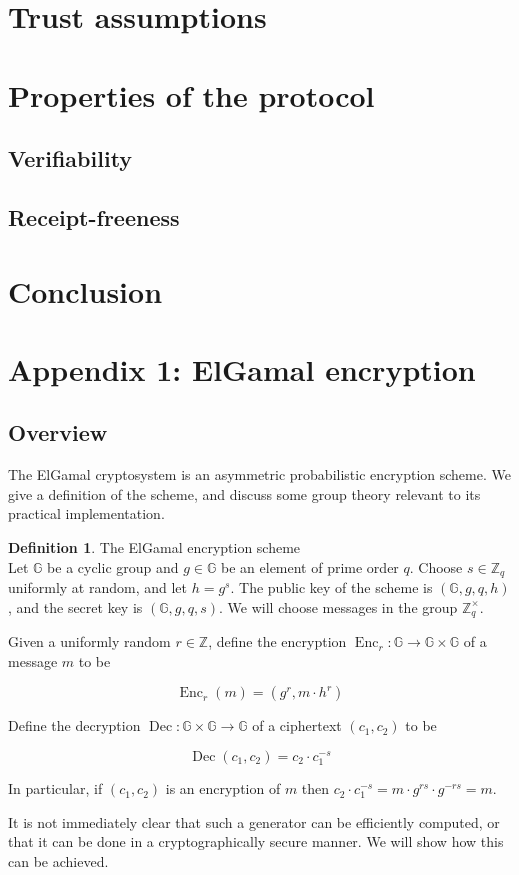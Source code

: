 \documentclass[11pt,twoside,a4paper]{article}
\DeclareMathOperator{\Enc}{Enc}
\DeclareMathOperator{\Dec}{Dec}
\theoremstyle{definition}
\newtheorem{definition}{Definition}[section]
\begin{document}
\section{Trust assumptions}
\section{Properties of the protocol}\label{sec-properties}
\subsection{Verifiability}
\subsection{Receipt-freeness}
\section{Conclusion}
\vfill\pagebreak
\section{Appendix 1: ElGamal encryption}\label{app-elgamal}
\subsection{Overview}
The ElGamal cryptosystem is an asymmetric probabilistic encryption scheme. We give a definition of the scheme, and discuss some group theory relevant to its practical implementation.
\begin{definition}{The ElGamal encryption scheme}\\
    Let \(\mathbb{G}\) be a cyclic group and \(g\in\mathbb{G}\) be an element of prime order \(q\). Choose \(s\in\mathbb{Z}_q\) uniformly at random, and let \(h=g^s\). The public key of the scheme is \((\mathbb{G}, g, q, h)\), and the secret key is \((\mathbb{G}, g, q, s)\). We will choose messages in the group \(\mathbb{Z}^\times_q\).

    Given a uniformly random \(r\in\mathbb{Z}\), define the encryption \(\Enc_r:\mathbb{G}\rightarrow\mathbb{G}\times\mathbb{G}\) of a message \(m\) to be
    
    \[\Enc_r(m) = (g^r, m\cdot h^r)\]

    Define the decryption \(\Dec:\mathbb{G}\times\mathbb{G}\rightarrow \mathbb{G}\) of a ciphertext \((c_1, c_2)\) to be
    
    \[\Dec(c_1,c_2)=c_2\cdot c_1^{-s}\]

    In particular, if \((c_1,c_2)\) is an encryption of \(m\) then \(c_2\cdot c_1^{-s}=m\cdot g^{rs}\cdot g^{-rs}=m\).
\end{definition}
It is not immediately clear that such a generator can be efficiently computed, or that it can be done in a cryptographically secure manner. We will show how this can be achieved.
\end{document}
